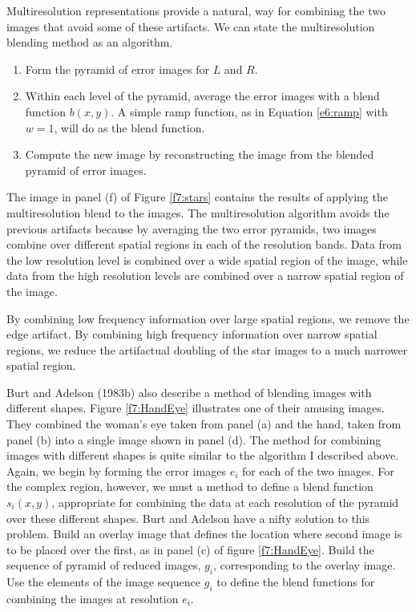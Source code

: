 Multiresolution representations provide a natural, way for combining
the two images that avoid some of these artifacts.  We can state the
multiresolution blending method as an algorithm.

\begin{enumerate}
\item Form the pyramid of error images for $L$ and $R$.
\item Within each level of the pyramid, average
the error images with a blend function $b(x,y)$.
A simple ramp function, as in Equation \ref{e6:ramp}
with $w = 1$, will do as the blend function.
\item Compute the new image by reconstructing the
image from the blended pyramid of error images.
\end{enumerate}

The image in panel (f) of Figure \ref{f7:stars} contains the results
of applying the multiresolution blend to the images.  The
multiresolution algorithm avoids the previous artifacts because by
averaging the two error pyramids, two images combine over different
spatial regions in each of the resolution bands.  Data from the low
resolution level is combined over a wide spatial region of the image,
while data from the high resolution levels are combined over a narrow
spatial region of the image.

By combining low frequency information over large spatial regions, we
remove the edge artifact.  By combining high frequency information
over narrow spatial regions, we reduce the artifactual doubling of the
star images to a much narrower spatial region.

Burt and Adelson (1983b) also describe a method of blending images
with different shapes.  Figure \ref{f7:HandEye} illustrates one of
their amusing images.  They combined the woman's eye taken from panel
(a) and the hand, taken from panel (b) into a single image shown in
panel (d).  The method for combining images with different shapes is
quite similar to the algorithm I described above.  Again, we begin by
forming the error images $e_i$ for each of the two images.  For the
complex region, however, we must a method to define a blend function
$s_i (x,y)$, appropriate for combining the data at each resolution of
the pyramid over these different shapes.  Burt and Adelson have a
nifty solution to this problem.  Build an overlay image that defines
the location where second image is to be placed over the first, as in
panel (c) of figure \ref{f7:HandEye}.  Build the sequence of pyramid
of reduced images, $g_i$, corresponding to the overlay image.  Use the
elements of the image sequence $g_i$ to define the blend functions for
combining the images at resolution $e_i$.

